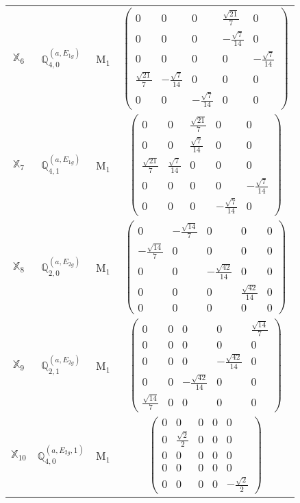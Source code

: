 \documentclass[fleqn,10pt,landscape]{article}
\begin{document}
\begin{itemize}
\begin{center}
\begin{longtable}{c|c|c|c}
$ \mathbb{X}_{6} $ & $\mathbb{Q}_{4,0}^{(a,E_{1g})}$ & M$_{1}$ & $\begin{pmatrix} 0 & 0 & 0 & \frac{\sqrt{21}}{7} & 0 \\ 0 & 0 & 0 & - \frac{\sqrt{7}}{14} & 0 \\ 0 & 0 & 0 & 0 & - \frac{\sqrt{7}}{14} \\ \frac{\sqrt{21}}{7} & - \frac{\sqrt{7}}{14} & 0 & 0 & 0 \\ 0 & 0 & - \frac{\sqrt{7}}{14} & 0 & 0 \end{pmatrix}$ \\
$ \mathbb{X}_{7} $ & $\mathbb{Q}_{4,1}^{(a,E_{1g})}$ & M$_{1}$ & $\begin{pmatrix} 0 & 0 & \frac{\sqrt{21}}{7} & 0 & 0 \\ 0 & 0 & \frac{\sqrt{7}}{14} & 0 & 0 \\ \frac{\sqrt{21}}{7} & \frac{\sqrt{7}}{14} & 0 & 0 & 0 \\ 0 & 0 & 0 & 0 & - \frac{\sqrt{7}}{14} \\ 0 & 0 & 0 & - \frac{\sqrt{7}}{14} & 0 \end{pmatrix}$ \\
$ \mathbb{X}_{8} $ & $\mathbb{Q}_{2,0}^{(a,E_{2g})}$ & M$_{1}$ & $\begin{pmatrix} 0 & - \frac{\sqrt{14}}{7} & 0 & 0 & 0 \\ - \frac{\sqrt{14}}{7} & 0 & 0 & 0 & 0 \\ 0 & 0 & - \frac{\sqrt{42}}{14} & 0 & 0 \\ 0 & 0 & 0 & \frac{\sqrt{42}}{14} & 0 \\ 0 & 0 & 0 & 0 & 0 \end{pmatrix}$ \\
$ \mathbb{X}_{9} $ & $\mathbb{Q}_{2,1}^{(a,E_{2g})}$ & M$_{1}$ & $\begin{pmatrix} 0 & 0 & 0 & 0 & \frac{\sqrt{14}}{7} \\ 0 & 0 & 0 & 0 & 0 \\ 0 & 0 & 0 & - \frac{\sqrt{42}}{14} & 0 \\ 0 & 0 & - \frac{\sqrt{42}}{14} & 0 & 0 \\ \frac{\sqrt{14}}{7} & 0 & 0 & 0 & 0 \end{pmatrix}$ \\
$ \mathbb{X}_{10} $ & $\mathbb{Q}_{4,0}^{(a,E_{2g},1)}$ & M$_{1}$ & $\begin{pmatrix} 0 & 0 & 0 & 0 & 0 \\ 0 & \frac{\sqrt{2}}{2} & 0 & 0 & 0 \\ 0 & 0 & 0 & 0 & 0 \\ 0 & 0 & 0 & 0 & 0 \\ 0 & 0 & 0 & 0 & - \frac{\sqrt{2}}{2} \end{pmatrix}$ \\

\end{longtable}
\end{center}
\end{itemize}
\end{document}
